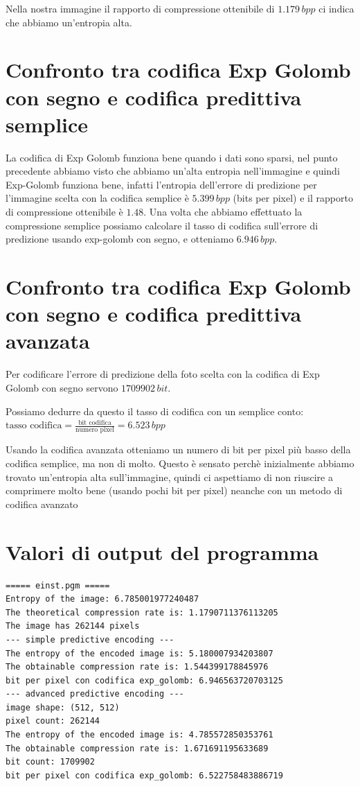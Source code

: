 \documentclass{article}
\begin{document}
Nella nostra immagine il rapporto di compressione ottenibile di $1.179 \, bpp$ ci indica che abbiamo un'entropia alta.

\section{Confronto tra codifica Exp Golomb con segno e codifica predittiva semplice}

La codifica di Exp Golomb funziona bene quando i dati sono sparsi, nel punto precedente abbiamo visto che abbiamo un'alta entropia nell'immagine e quindi Exp-Golomb funziona bene, infatti l'entropia dell'errore di predizione per l'immagine scelta con la codifica semplice è $5.399 \, bpp$ (bits per pixel) e il rapporto di compressione ottenibile è $1.48$.
Una volta che abbiamo effettuato la compressione semplice possiamo calcolare il tasso di codifica sull'errore di predizione usando exp-golomb con segno, e otteniamo $6.946 \, bpp$.

\section{Confronto tra codifica Exp Golomb con segno e codifica predittiva avanzata}


Per codificare l'errore di predizione della foto scelta con la codifica di Exp Golomb con segno servono $1709902 \, bit$.

Possiamo dedurre da questo il tasso di codifica con un semplice conto:
$ \text{tasso codifica} = \frac{\text{bit codifica}}{\text{numero pixel}} = 6.523 \, bpp$

Usando la codifica avanzata otteniamo un numero di bit per pixel più basso della codifica semplice, ma non di molto.
Questo è sensato perchè inizialmente abbiamo trovato un'entropia alta sull'immagine, quindi ci aspettiamo di non riuscire a comprimere molto bene (usando pochi bit per pixel) neanche con un metodo di codifica avanzato

\section{Valori di output del programma}

\begin{lstlisting}
===== einst.pgm =====
Entropy of the image: 6.785001977240487
The theoretical compression rate is: 1.1790711376113205
The image has 262144 pixels
--- simple predictive encoding ---
The entropy of the encoded image is: 5.180007934203807
The obtainable compression rate is: 1.544399178845976
bit per pixel con codifica exp_golomb: 6.946563720703125
--- advanced predictive encoding ---
image shape: (512, 512)
pixel count: 262144
The entropy of the encoded image is: 4.785572850353761
The obtainable compression rate is: 1.671691195633689
bit count: 1709902
bit per pixel con codifica exp_golomb: 6.522758483886719
\end{lstlisting}
\end{document}
